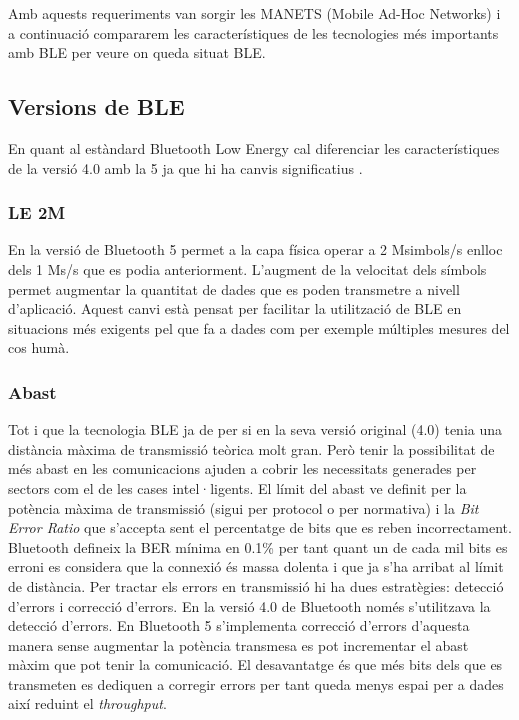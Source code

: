 Amb aquests requeriments van sorgir les MANETS (Mobile Ad-Hoc Networks) i a continuació compararem les característiques de les tecnologies més importants amb BLE per veure on queda situat BLE.

\subsection{Versions de BLE}
En quant al estàndard Bluetooth Low Energy cal diferenciar les característiques de la versió 4.0 amb la 5 ja que hi ha canvis significatius \cite{BLE_5_improvement_over_4}.

\subsubsection{LE 2M}
En la versió de Bluetooth 5 permet a la capa física operar a 2 Msimbols/s enlloc dels 1 Ms/s que es podia anteriorment. L'augment de la velocitat dels símbols permet augmentar la quantitat de dades que es poden transmetre a nivell d'aplicació.
Aquest canvi està pensat per facilitar la utilització de BLE en situacions més exigents pel que fa a dades com per exemple múltiples mesures del cos humà.

\subsubsection{Abast}
Tot i que la tecnologia BLE ja de per si en la seva versió original (4.0) tenia una distància màxima de transmissió teòrica molt gran.
Però tenir la possibilitat de més abast en les comunicacions ajuden a cobrir les necessitats generades per sectors com el de les cases intel·ligents.
El límit del abast ve definit per la potència màxima de transmissió (sigui per protocol o per normativa) i la \textit{Bit Error Ratio} que s'accepta sent el percentatge de bits que es reben incorrectament.
Bluetooth defineix la BER mínima en 0.1\% per tant quant un de cada mil bits es erroni es considera que la connexió és massa dolenta i que ja s'ha arribat al límit de distància.
Per tractar els errors en transmissió hi ha dues estratègies: detecció d'errors i correcció d'errors.
En la versió 4.0 de Bluetooth només s'utilitzava la detecció d'errors.
En Bluetooth 5 s'implementa correcció d'errors d'aquesta manera sense augmentar la potència transmesa es pot incrementar el abast màxim que pot tenir la comunicació.
El desavantatge és que més bits dels que es transmeten es dediquen a corregir errors per tant queda menys espai per a dades així reduint el \textit{throughput}.



